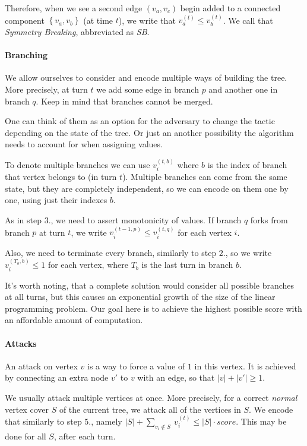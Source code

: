 \documentclass[12pt, A4]{article}
\begin{document}
Therefore, when we see a second edge $(v_a, v_c)$ begin added to a connected component $\left\{ v_a, v_b\right\}$ (at time $t$), we write that $v_a^{(t)} \le v_b^{(t)}$. We call that \textit{Symmetry Breaking}, abbreviated as \textit{SB}.


\paragraph{Branching}
We allow ourselves to consider and encode multiple ways of building the tree. More precisely, at turn $t$ we add some edge in branch $p$ and another one in branch $q$. Keep in mind that branches cannot be merged.

One can think of them as an option for the adversary to change the tactic depending on the state of the tree. Or just an another possibility the algorithm needs to account for when assigning values.

To denote multiple branches we can use $v_i^{(t, b)}$ where $b$ is the index of branch that vertex belongs to (in turn $t$). Multiple branches can come from the same state, but they are completely independent, so we can encode on them one by one, using just their indexes $b$.

As in step $3.$, we need to assert monotonicity of values. If branch $q$ forks from branch $p$ at turn $t$, we write $v_i^{(t-1, p)} \le v_i^{(t, q)}$ for each vertex $i$.

Also, we need to terminate every branch, similarly to step $2.$, so we write $v_i^{(T_b, b)} \le 1$ for each vertex, where $T_b$ is the last turn in branch $b$.

It's worth noting, that a complete solution would consider all possible branches at all turns, but this causes an exponential growth of the size of the linear programming problem. Our goal here is to achieve the highest possible score with an affordable amount of computation.


\paragraph{Attacks}
An attack on vertex $v$ is a way to force a value of $1$ in this vertex. It is achieved by connecting an extra node $v'$ to $v$ with an edge, so that $|v| + |v'| \ge 1$.

We usually attack multiple vertices at once. More precisely, for a correct \textit{normal} vertex cover $S$ of the current tree, we attack all of the vertices in $S$. We encode that similarly to step $5.$, namely $|S| + \sum_{v_i \not \in S} \ v_i^{(t)} \le |S| \cdot score$. This may be done for all $S$, after each turn.
\end{document}

